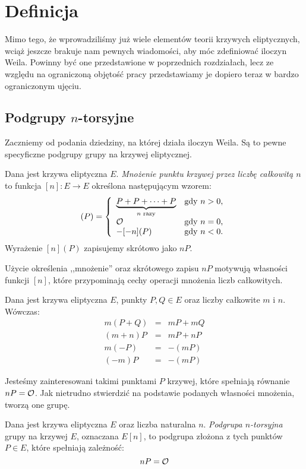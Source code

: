 \section{Definicja}

Mimo tego, że wprowadziliśmy już
wiele elementów teorii krzywych eliptycznych,
wciąż jeszcze brakuje nam pewnych wiadomości,
aby móc zdefiniować iloczyn Weila.
Powinny być one przedstawione w poprzednich rozdziałach,
lecz ze względu na ograniczoną objętość pracy
przedstawiamy je dopiero teraz
w bardzo ograniczonym ujęciu.

\subsection*{Podgrupy $n$-torsyjne}

Zaczniemy od podania dziedziny,
na której działa iloczyn Weila.
Są to pewne specyficzne podgrupy
grupy na krzywej eliptycznej.

\begin{definition}
Dana jest krzywa eliptyczna $E$.
\emph{Mnożenie punktu krzywej przez liczbę całkowitą $n$}
to funkcja $[n] \colon E \to E$
określona następującym wzorem:
\begin{equation}
[n](P) =
\fundefthree
{\underbrace{P + P + \cdots + P}_{n\textrm{ razy}}}{n > 0}
{\ecident}{n = 0}
{-[-n](P)}{n < 0}
\end{equation}
Wyrażenie $[n](P)$ zapisujemy skrótowo jako $nP$.
\end{definition}

Użycie określenia ,,mnożenie'' oraz skrótowego zapisu $nP$
motywują własności funkcji $[n]$,
które przypominają cechy operacji mnożenia liczb całkowitych.

\begin{fact}
Dana jest krzywa eliptyczna $E$, punkty $P, Q \in E$
oraz liczby całkowite $m$ i $n$.
Wówczas:
\begin{eqnarray*}
m(P + Q) & = & mP + mQ \\
(m + n)P & = & mP + nP \\
m(-P) & = & -(mP) \\
(-m)P & = & -(mP)
\end{eqnarray*}
\end{fact}

Jesteśmy zainteresowani takimi punktami $P$ krzywej,
które spełniają równanie $nP = \mathcal{O}$.
Jak nietrudno stwierdzić na podstawie podanych własności mnożenia,
tworzą one grupę.

\begin{definition}
Dana jest krzywa eliptyczna $E$
oraz liczba naturalna $n$.
\emph{Podgrupa $n$-torsyjna} grupy na krzywej $E$,
oznaczana $E[n]$,
to podgrupa złożona z tych punktów $P \in E$,
które spełniają zależność:
\begin{equation}
nP = \mathcal{O}
\end{equation}
\end{definition}


